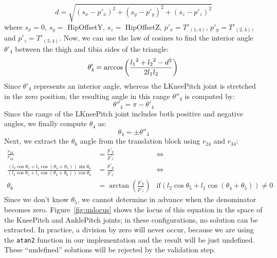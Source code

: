 \[
d = \sqrt{\left(s_x-p'_x\right)^2 + \left(s_y-p'_y\right)^2 + \left(s_z-p'_z\right)^2}
\]
where $s_x = 0$, $s_y = $ HipOffsetY, $s_z =$ HipOffsetZ, $p'_x = T'_{(1,4)}$, $p'_y = T'_{(2,4)}$, and $p'_z = T'_{(3,4)}$. Now, we can use the law of cosines to find the interior angle $\theta'_4$ between the thigh and tibia sides of the triangle:
\[
\theta'_4 =\arccos\left(\frac{{l_1}^2 + {l_2}^2 - d^2}{2 l_1 l_2}\right)\\
\]
Since $\theta'_4$ represents an interior angle, whereas the LKneePitch joint is stretched in the zero position, the resulting angle in this range $\theta''_4$ is computed by:
\[
\theta''_4 = \pi - \theta'_4
\]
Since the range of the LKneePitch joint includes both positive and negative angles, we finally compute $\theta_4$ as:
\[
\theta_4 = \pm\theta''_4
\]
Next, we extract the $\theta_6$ angle from the translation block using $r_{24}$ and $r_{34}$:
\begin{align*}
\frac{r_{24}}{r_{34}} &= \frac{p'_y}{p'_z} &\Leftrightarrow \\
\frac{\left(l_2\cos\theta_5 + l_1 \cos\left(\theta_4 + \theta_5\right)\right)\sin\theta_6}{\left(l_2\cos\theta_5 + l_1 \cos\left(\theta_4 + \theta_6\right)\right) \cos\theta_6} &= \frac{p'_y}{p'_z} &\Leftrightarrow \\
\theta_6 &= \arctan\left(\frac{p'_y}{p'_z}\right)&\text{if} \left(l_2\cos\theta_5 + l_1 \cos\left(\theta_4 + \theta_5\right)\right) \neq 0
\end{align*}
Since we don't know $\theta_5$, we cannot determine in advance when the denominator becomes zero. Figure~\ref{fig:unlocus} shows the locus of this equation in the space of the KneePitch and AnklePitch joints; in these configurations, no solution can be extracted. In practice, a division by zero will never occur, because we are using the {\tt atan2} function in our implementation and the result will be just undefined. These ``undefined'' solutions will be rejected by the validation step.

